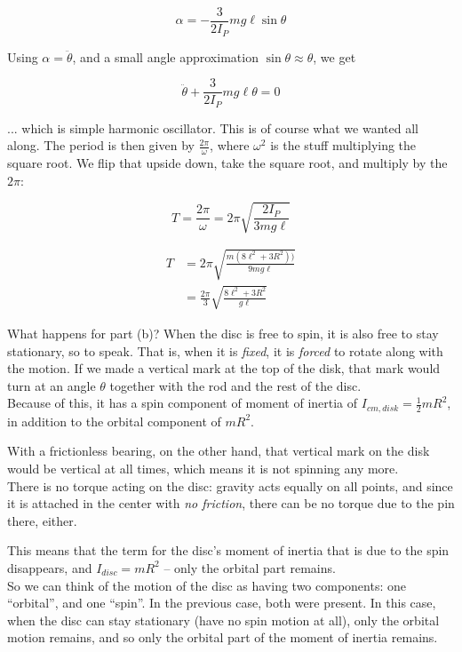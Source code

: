\documentclass[8.01x]{subfiles}
\begin{document}
\begin{equation}
\alpha = -\frac{3}{2 I_P} m g \ell \sin \theta
\end{equation}

Using $\alpha = \ddot{\theta}$, and a small angle approximation $\sin \theta \approx \theta$, we get

\begin{equation}
\ddot{\theta} + \frac{3}{2 I_P} m g \ell \theta = 0
\end{equation}

... which is simple harmonic oscillator. This is of course what we wanted all along. The period is then given by $\displaystyle \frac{2 \pi}{\omega}$, where $\omega^2$ is the stuff multiplying the square root. We flip that upside down, take the square root, and multiply by the $2 \pi$:

\begin{equation}
T = \frac{2 \pi}{\omega} = 2 \pi \sqrt{\frac{2 I_P}{3 m g \ell}}
\end{equation}

\begin{align}
T &= 2 \pi \sqrt{\frac{m (8 \ell^2 + 3 R^2))}{9 m g \ell}}\\
                         &= \frac{2\pi}{3} \sqrt{\frac{8 \ell^2 + 3 R^2}{g \ell}}
\end{align}

What happens for part (b)? When the disc is free to spin, it is also free to stay stationary, so to speak. 
That is, when it is \emph{fixed}, it is \emph{forced} to rotate along with the motion. If we made a vertical mark at the top of the disk, that mark would turn at an angle $\theta$ together with the rod and the rest of the disc.\\
Because of this, it has a spin component of moment of inertia of $I_{cm,disk} = \frac{1}{2} m R^2$, in addition to the orbital component of $m R^2$.

With a frictionless bearing, on the other hand, that vertical mark on the disk would be vertical at all times, which means it is not spinning any more.\\
There is no torque acting on the disc: gravity acts equally on all points, and since it is attached in the center with \emph{no friction}, there can be no torque due to the pin there, either.

This means that the term for the disc's moment of inertia that is due to the spin disappears, and $I_{disc} = m R^2$ -- only the orbital part remains.\\
So we can think of the motion of the disc as having two components: one ``orbital'', and one ``spin''. In the previous case, both were present. In this case, when the disc can stay stationary (have no spin motion at all), only the orbital motion remains, and so only the orbital part of the moment of inertia remains.
\end{document}

